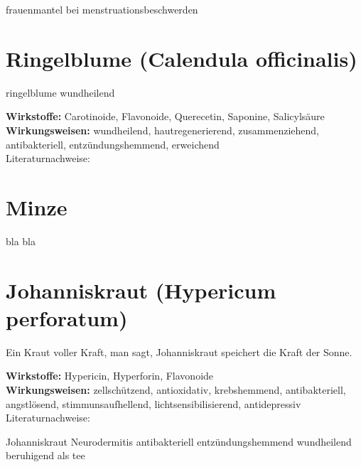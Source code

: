 frauenmantel
bei menstruationsbeschwerden


\section{Ringelblume (Calendula officinalis)}
\label{   }

ringelblume
wundheilend

\textbf{Wirkstoffe:} Carotinoide, Flavonoide, Querecetin, Saponine, Salicylsäure\\

\textbf{Wirkungsweisen:} wundheilend, hautregenerierend, zusammenziehend, antibakteriell, entzündungshemmend, erweichend \\

Literaturnachweise: \cite{nedoma2018heilsalben}



\section{Minze}
\label{   }



bla bla



\section{Johanniskraut (Hypericum perforatum)}
\label{   }



Ein Kraut voller Kraft, man sagt, Johanniskraut speichert die Kraft der Sonne.

\textbf{Wirkstoffe:} Hypericin, Hyperforin, Flavonoide\\

\textbf{Wirkungsweisen:} zellschützend, antioxidativ, krebshemmend, antibakteriell, angstlösend, stimmunsaufhellend, lichtsensibilisierend, antidepressiv\\

Literaturnachweise: \cite{nedoma2018heilsalben}

Johanniskraut
Neurodermitis
antibakteriell
entzündungshemmend
wundheilend
beruhigend als tee

